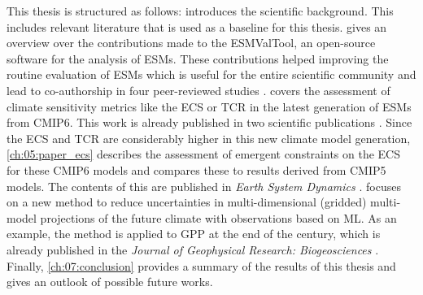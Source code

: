 This thesis is structured as follows: 
introduces the scientific background. This includes relevant literature that is
used as a baseline for this thesis.  gives an overview
over the contributions made to the \ac{ESMValTool}, an open-source software for
the analysis of \acp{ESM}. These contributions helped improving the routine
evaluation of \acp{ESM} which is useful for the entire scientific community and
lead to co-authorship in four peer-reviewed studies \autocite{Eyring2020,
  Lauer2020, Righi2020, Weigel2020}. 
covers the assessment of climate sensitivity metrics like the \ac{ECS} or
\ac{TCR} in the latest generation of \acp{ESM} from \acs{CMIP}6. This work is
already published in two scientific publications \autocite{Bock2020,
  Meehl2020}. Since the \ac{ECS} and \ac{TCR} are considerably higher in this
new climate model generation, \cref{ch:05:paper_ecs} describes the assessment
of emergent constraints on the \ac{ECS} for these \acs{CMIP}6 models and
compares these to results derived from \acs{CMIP}5 models. The contents of this
 are published in \emph{Earth System Dynamics}
\autocite{Schlund2020a}.  focuses on a new method to
reduce uncertainties in multi-dimensional (gridded) multi-model projections of
the future climate with observations based on \ac{ML}. As an example, the
method is applied to \ac{GPP} at the end of the  century, which is
already published in the \emph{Journal of Geophysical Research: Biogeosciences}
\autocite{Schlund2020}. Finally, \cref{ch:07:conclusion} provides a summary of
the results of this thesis and gives an outlook of possible future works.
